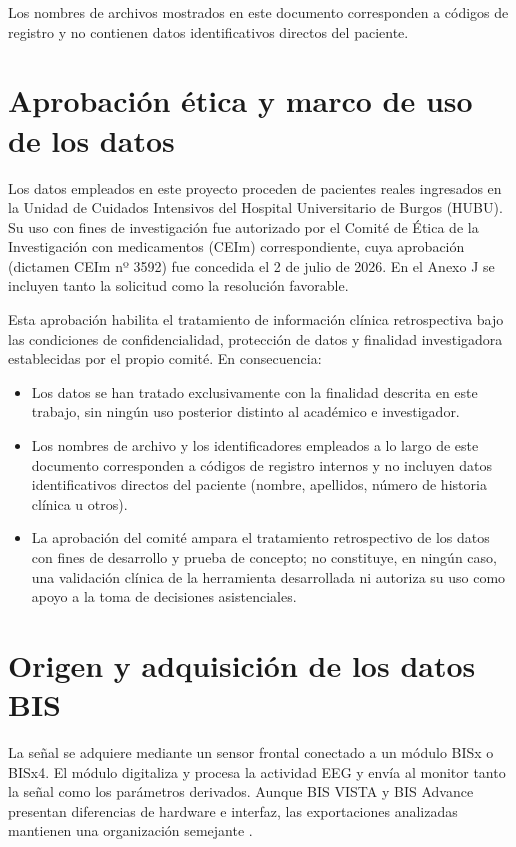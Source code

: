 \documentclass[
  spanish,
  a4paper,
  12pt,
  twoside]{memoir}
\providecommand{\tightlist}{%
  \setlength{\itemsep}{0pt}\setlength{\parskip}{0pt}}
\begin{document}
Los nombres de archivos mostrados en este documento corresponden a
códigos de registro y no contienen datos identificativos directos del
paciente.

\chapter{Aprobación ética y marco de uso de los
datos}\label{aprobaciuxf3n-uxe9tica-y-marco-de-uso-de-los-datos}

Los datos empleados en este proyecto proceden de pacientes reales
ingresados en la Unidad de Cuidados Intensivos del Hospital
Universitario de Burgos (HUBU). Su uso con fines de investigación fue
autorizado por el Comité de Ética de la Investigación con medicamentos
(CEIm) correspondiente, cuya aprobación (dictamen CEIm nº 3592) fue
concedida el 2 de julio de 2026. En el Anexo J se incluyen tanto la
solicitud como la resolución favorable.

Esta aprobación habilita el tratamiento de información clínica
retrospectiva bajo las condiciones de confidencialidad, protección de
datos y finalidad investigadora establecidas por el propio comité. En
consecuencia:

\begin{itemize}
\tightlist
\item
  Los datos se han tratado exclusivamente con la finalidad descrita en
  este trabajo, sin ningún uso posterior distinto al académico e
  investigador.
\item
  Los nombres de archivo y los identificadores empleados a lo largo de
  este documento corresponden a códigos de registro internos y no
  incluyen datos identificativos directos del paciente (nombre,
  apellidos, número de historia clínica u otros).
\item
  La aprobación del comité ampara el tratamiento retrospectivo de los
  datos con fines de desarrollo y prueba de concepto; no constituye, en
  ningún caso, una validación clínica de la herramienta desarrollada ni
  autoriza su uso como apoyo a la toma de decisiones asistenciales.
\end{itemize}

\chapter{Origen y adquisición de los datos
BIS}\label{origen-y-adquisiciuxf3n-de-los-datos-bis}

La señal se adquiere mediante un sensor frontal conectado a un módulo
BISx o BISx4. El módulo digitaliza y procesa la actividad EEG y envía al
monitor tanto la señal como los parámetros derivados. Aunque BIS VISTA y
BIS Advance presentan diferencias de hardware e interfaz, las
exportaciones analizadas mantienen una organización semejante
\citep{CovidienBISadvanced}.
\end{document}
